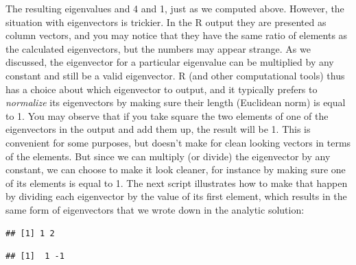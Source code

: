 \documentclass[
]{book}
\newenvironment{Shaded}{\begin{snugshade}}{\end{snugshade}}
\newcommand{\DecValTok}[1]{\textcolor[rgb]{0.00,0.00,0.81}{#1}}
\newcommand{\KeywordTok}[1]{\textcolor[rgb]{0.13,0.29,0.53}{\textbf{#1}}}
\newcommand{\NormalTok}[1]{#1}
\newcommand{\OperatorTok}[1]{\textcolor[rgb]{0.81,0.36,0.00}{\textbf{#1}}}
\theoremstyle{definition}
\theoremstyle{definition}
\theoremstyle{definition}
\theoremstyle{remark}
\begin{document}
The resulting eigenvalues and 4 and 1, just as we computed above. However, the situation with eigenvectors is trickier. In the R output they are presented as column vectors, and you may notice that they have the same ratio of elements as the calculated eigenvectors, but the numbers may appear strange. As we discussed, the eigenvector for a particular eigenvalue can be multiplied by any constant and still be a valid eigenvector. R (and other computational tools) thus has a choice about which eigenvector to output, and it typically prefers to \emph{normalize} its eigenvectors by making sure their length (Euclidean norm) is equal to 1. You may observe that if you take square the two elements of one of the eigenvectors in the output and add them up, the result will be 1. This is convenient for some purposes, but doesn't make for clean looking vectors in terms of the elements. But since we can multiply (or divide) the eigenvector by any constant, we can choose to make it look cleaner, for instance by making sure one of its elements is equal to 1. The next script illustrates how to make that happen by dividing each eigenvector by the value of its first element, which results in the same form of eigenvectors that we wrote down in the analytic solution:

\begin{Shaded}
\end{Shaded}

\begin{verbatim}
## [1] 1 2
\end{verbatim}

\begin{Shaded}
\end{Shaded}

\begin{verbatim}
## [1]  1 -1
\end{verbatim}
\end{document}
